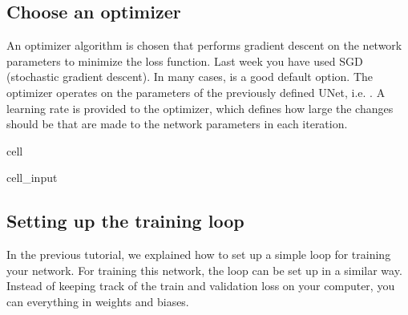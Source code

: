 \documentclass[letterpaper,10pt,english]{jupyterBook}
\begin{document}
\subsection{Choose an optimizer}
\label{\detokenize{notebooks/Tutorial3_Segmentation/Tutorial3_Segmentation_student:choose-an-optimizer}}
\sphinxAtStartPar
An optimizer algorithm is chosen that performs gradient descent on the network parameters to minimize the loss function. Last week you have used SGD (stochastic gradient descent). In many cases,  is a good default option. The optimizer operates on the parameters of the previously defined U\sphinxhyphen{}Net, i.e. . A learning rate  is provided to the optimizer, which defines how large the changes should be that are made to the network parameters in each iteration.

\begin{sphinxuseclass}{cell}\begin{sphinxVerbatimInput}

\begin{sphinxuseclass}{cell_input}
\begin{sphinxVerbatim}[commandchars=\\\{\}]
   
\end{sphinxVerbatim}

\end{sphinxuseclass}\end{sphinxVerbatimInput}

\end{sphinxuseclass}

\subsection{Setting up the training loop}
\label{\detokenize{notebooks/Tutorial3_Segmentation/Tutorial3_Segmentation_student:setting-up-the-training-loop}}
\sphinxAtStartPar
In the previous tutorial, we explained how to set up a simple loop for training your network. For training this network, the loop can be set up in a similar way.
Instead of keeping track of the train and validation loss on your computer, you can  everything in weights and biases.
\end{document}
